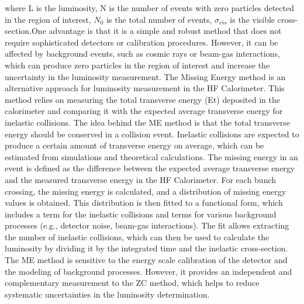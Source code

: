 \begin{itemize}
where L is the luminosity, N is the number of events with zero particles detected in the region of interest, $N_0$ is the total number of events, $\sigma_{vis}$ is the visible cross-section.One advantage is that it is a simple and robust method that does not require sophisticated detectors or calibration procedures. However, it can be affected by background events, such as cosmic rays or beam-gas interactions, which can produce zero particles in the region of interest and increase the uncertainty in the luminosity measurement.
The Missing Energy method is an alternative approach for luminosity measurement in the HF Calorimeter. This method relies on measuring the total transverse energy (Et) deposited in the calorimeter and comparing it with the expected average transverse energy for inelastic collisions. The idea behind the ME method is that the total transverse energy should be conserved in a collision event. Inelastic collisions are expected to produce a certain amount of transverse energy on average, which can be estimated from simulations and theoretical calculations. The missing energy in an event is defined as the difference between the expected average transverse energy and the measured transverse energy in the HF Calorimeter. For each bunch crossing, the missing energy is calculated, and a distribution of missing energy values is obtained. This distribution is then fitted to a functional form, which includes a term for the inelastic collisions and terms for various background processes (e.g., detector noise, beam-gas interactions). The fit allows extracting the number of inelastic collisions, which can then be used to calculate the luminosity by dividing it by the integrated time and the inelastic cross-section. The ME method is sensitive to the energy scale calibration of the detector and the modeling of background processes. However, it provides an independent and complementary measurement to the ZC method, which helps to reduce systematic uncertainties in the luminosity determination.




\end{itemize}
